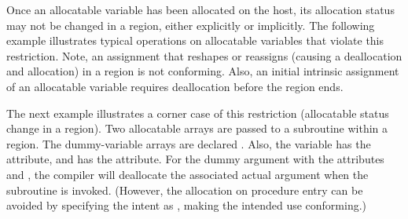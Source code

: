 
Once an allocatable variable has been allocated on the host,
its allocation status may not be changed in a  region, either
explicitly or implicitly. The following example illustrates typical
operations on allocatable variables that violate this restriction.
Note, an assignment that reshapes or reassigns (causing a deallocation
and allocation) in a  region is not conforming.
Also, an initial intrinsic assignment of an allocatable variable 
requires deallocation before the  region ends.


\newpage
The next example illustrates a corner case of this restriction (allocatable status
change in a  region).
Two allocatable arrays are passed to a subroutine within a 
region. The dummy-variable arrays are declared .
Also, the  variable has the  attribute, and 
has the  attribute. 
For the dummy argument with the attributes  and , 
the compiler will deallocate the associated actual argument when the subroutine is invoked. 
(However, the allocation on procedure entry can be avoided by specifying the intent 
as , making the intended use conforming.)

